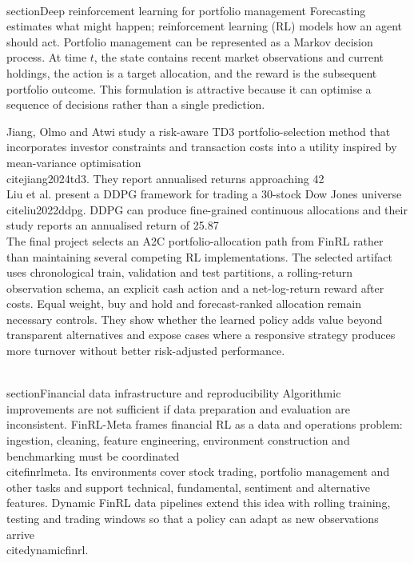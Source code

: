 \\section{Deep reinforcement learning for portfolio management}
Forecasting estimates what might happen; reinforcement learning (RL) models how an agent should act. Portfolio management can be represented as a Markov decision process. At time $t$, the state contains recent market observations and current holdings, the action is a target allocation, and the reward is the subsequent portfolio outcome. This formulation is attractive because it can optimise a sequence of decisions rather than a single prediction.

Jiang, Olmo and Atwi study a risk-aware TD3 portfolio-selection method that incorporates investor constraints and transaction costs into a utility inspired by mean-variance optimisation \\cite{jiang2024td3}. They report annualised returns approaching 42\\%

Liu et al. present a DDPG framework for trading a 30-stock Dow Jones universe \\cite{liu2022ddpg}. DDPG can produce fine-grained continuous allocations and their study reports an annualised return of 25.87\\%

The final project selects an A2C portfolio-allocation path from FinRL rather than maintaining several competing RL implementations. The selected artifact uses chronological train, validation and test partitions, a rolling-return observation schema, an explicit cash action and a net-log-return reward after costs. Equal weight, buy and hold and forecast-ranked allocation remain necessary controls. They show whether the learned policy adds value beyond transparent alternatives and expose cases where a responsive strategy produces more turnover without better risk-adjusted performance.

\\section{Financial data infrastructure and reproducibility}
Algorithmic improvements are not sufficient if data preparation and evaluation are inconsistent. FinRL-Meta frames financial RL as a data and operations problem: ingestion, cleaning, feature engineering, environment construction and benchmarking must be coordinated \\cite{finrlmeta}. Its environments cover stock trading, portfolio management and other tasks and support technical, fundamental, sentiment and alternative features. Dynamic FinRL data pipelines extend this idea with rolling training, testing and trading windows so that a policy can adapt as new observations arrive \\cite{dynamicfinrl}.

